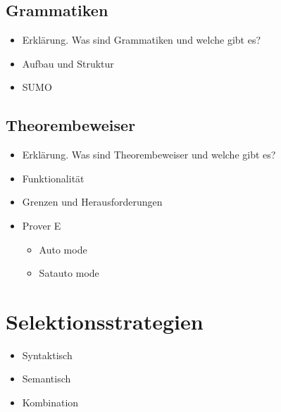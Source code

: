 \documentclass[german,version-2020-11]{uzl-thesis}
\begin{document}
\section{Grammatiken}
\begin{itemize}
  \item Erklärung. Was sind Grammatiken und welche gibt es?
  \item Aufbau und Struktur
  \item SUMO
\end{itemize}
\section{Theorembeweiser}
\begin{itemize}
  \item Erklärung. Was sind Theorembeweiser und welche gibt es?
  \item Funktionalität
  \item Grenzen und Herausforderungen
  \item Prover E
  \begin{itemize}
    \item Auto mode 
    \item Satauto mode 
  \end{itemize}
\end{itemize}
\chapter{Selektionsstrategien}
\begin{itemize}
  \item Syntaktisch 
  \item Semantisch
  \item Kombination
\end{itemize}
\end{document}
